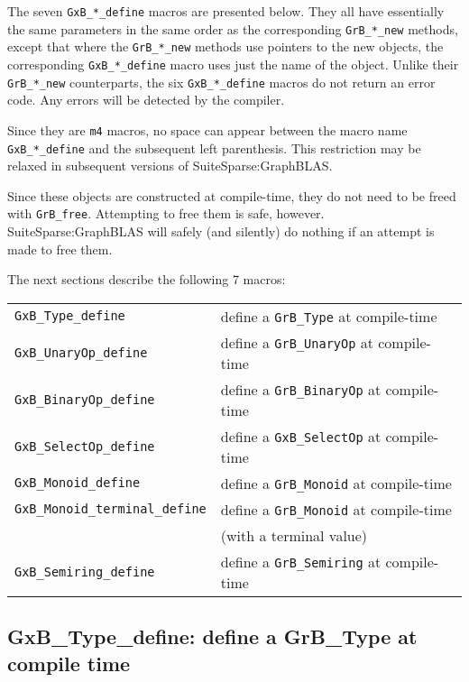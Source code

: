 \documentclass[12pt]{article}
\begin{document}
The seven \verb'GxB_*_define' macros are presented below.  They all have
essentially the same parameters in the same order as the corresponding
\verb'GrB_*_new' methods, except that where the \verb'GrB_*_new' methods use
pointers to the new objects, the corresponding \verb'GxB_*_define' macro uses
just the name of the object.  Unlike their \verb'GrB_*_new' counterparts, the
six \verb'GxB_*_define' macros do not return an error code.  Any errors will be
detected by the compiler.

Since they are \verb'm4' macros, no space can appear between the macro name
\verb'GxB_*_define' and the subsequent left parenthesis.  This restriction may
be relaxed in subsequent versions of SuiteSparse:GraphBLAS.

Since these objects are constructed at compile-time, they do not need to be
freed with \verb'GrB_free'.  Attempting to free them is safe, however.
SuiteSparse:GraphBLAS will safely (and silently) do nothing if an attempt is
made to free them.

The next sections describe the following 7 macros:

\vspace{0.2in}
{\footnotesize
\begin{tabular}{ll}
\hline
\verb'GxB_Type_define'      & define a \verb'GrB_Type' at compile-time \\
\verb'GxB_UnaryOp_define'   & define a \verb'GrB_UnaryOp' at compile-time \\
\verb'GxB_BinaryOp_define'  & define a \verb'GrB_BinaryOp' at compile-time \\
\verb'GxB_SelectOp_define'  & define a \verb'GxB_SelectOp' at compile-time \\
\verb'GxB_Monoid_define'    & define a \verb'GrB_Monoid' at compile-time \\
\verb'GxB_Monoid_terminal_define'
    & define a \verb'GrB_Monoid' at compile-time \\
    & (with a terminal value) \\
\verb'GxB_Semiring_define'  & define a \verb'GrB_Semiring' at compile-time \\
\hline
\end{tabular}
}
\vspace{0.2in}

\newpage
\subsection{{\sf GxB\_Type\_define:} define a {\sf GrB\_Type} at compile time}
\label{type_define}
\end{document}
